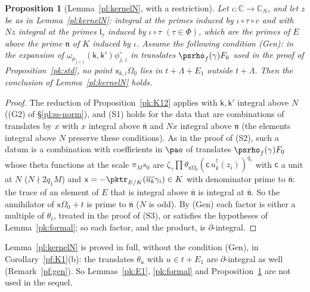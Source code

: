 \documentclass[10pt]{amsart}
\newtheorem{proposition}[theorem]{Proposition}
\theoremstyle{definition}
\theoremstyle{remark}
\newcommand{\C}{\mathbb C}
\providecommand{\auPl}{\Phi}
\providecommand{\aubar}[1]{\overline{#1}}
\begin{document}
\begin{proposition}[Lemma~\ref{pl:kernelN}, with a restriction]\label{pk:K1N}
Let $\iota\colon\C\to\C_N$, and let $z$ be as in Lemma~\ref{pl:kernelN}: integral at the primes
induced by $\iota\circ\tau\circ c$ and with $Nz$ integral at the primes $\mathfrak l_\tau$ induced
by $\iota\circ\tau$ $(\tau\in\auPl)$, which are the primes of $E$ above the prime $\mathfrak n$ of
$K$ induced by $\iota$. Assume the following condition {\rm(Gen)}: in the expansion of
$\omega_{\mu_{j+1}}(\mathsf k,\mathsf k')\phi^\circ_{j,z}$ in translates $\psrho_f(\gamma)F_0$
used in the proof of Proposition~\ref{pk:std}, no point $\mathsf x_{k,i}\Omega_0$ lies in
$t+\Lambda+E_1$ outside $t+\Lambda$. Then the conclusion of Lemma~\ref{pl:kernelN} holds.
\end{proposition}
\begin{proof}
The reduction of Proposition~\ref{pk:K12} applies with $\mathsf k,\mathsf k'$ integral above $N$
((G2) of \S\ref{pl:ss-norm}), and (S1) holds for the data that are combinations of translates by
$x$ with $x$ integral above $\aubar{\mathfrak n}$ and $Nx$ integral above $\mathfrak n$ (the
elements integral above $N$ preserve these conditions). As in the proof of (S2), such a datum is
a combination with coefficients in $\pao$ of translates $\psrho_f(\gamma)F_0$ whose theta
functions at the scale $\pi_Ms_0$ are $\zeta_\gamma\prod\theta_{\mathsf x\Omega_0}(\mathsf c\,
u_k^\dagger(z_i))^{q_1}$ with $\mathsf c$ a unit at $N$ ($N\nmid2q_1M$) and $\mathsf x=-\pktr_{E/K}(
\aubar{u_k}\gamma_i)\in K$ with denominator prime to $\aubar{\mathfrak n}$: the trace of an element
of $E$ that is integral above $\aubar{\mathfrak n}$ is integral at $\aubar{\mathfrak n}$. So the
annihilator of $\mathsf x\Omega_0+t$ is prime to $\aubar{\mathfrak n}$ ($N$ is odd). By (Gen) each
factor is either a multiple of $\theta_t$, treated in the proof of (S3), or satisfies the
hypotheses of Lemma~\ref{pk:formal}; so each factor, and the product, is $\partial$-integral.
\end{proof}
Lemma~\ref{pl:kernelN} is proved in full, without the condition (Gen), in Corollary~\ref{pf:K1}(b):
the translates $\theta_u$ with $u\in t+E_1$ are $\partial$-integral as well (Remark~\ref{pf:gen}). So
Lemmas~\ref{pk:E1}, \ref{pk:formal} and Proposition~\ref{pk:K1N} are not used in the sequel.
\end{document}
